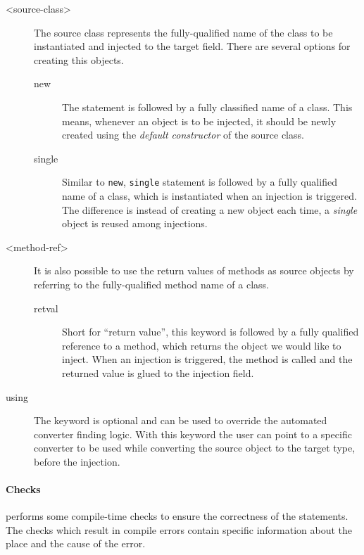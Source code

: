 \begin{description}
\item[<source-class>] The source class represents the fully-qualified name of the class to be instantiated and injected to the target field. There are several options for creating this objects.
	\begin{description}
	\item[new] The  statement is followed by a fully classified name of a class. This means, whenever an object is to be injected, it should be newly created using the \emph{default constructor} of the source class. 

	\item[single] Similar to \lstinline{new}, \lstinline{single} statement is followed by a fully qualified name of a class, which is instantiated when an injection is triggered. The difference is instead of creating a new object each time, a \emph{single} object is reused among injections.
\end{description}
\item[<method-ref>] It is also possible to use the return values of methods as source objects by referring to the fully-qualified method name of a class.
\begin{description}
 \item[retval] Short for ``return value'', this keyword is followed by a fully qualified reference to a method, which returns the object we would like to inject. When an injection is triggered, the method is called and the returned value is glued to the injection field.
\end{description}
\item[using] The  keyword is optional and can be used to override the automated converter finding logic. With this keyword the user can point to a specific converter to be used while converting the source object to the target type, before the injection. 
\end{description}

\paragraph{Checks} \zamk performs some compile-time checks to ensure the correctness of the \gluer statements. 
The checks which result in compile errors contain specific information about the place and the cause of the error.

